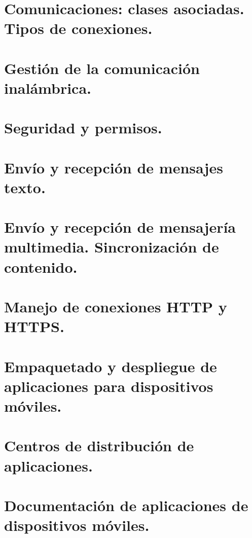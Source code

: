 \documentclass[a4paper,12pt,spanish]{sphinxmanual}
\begin{document}
\section{Comunicaciones: clases asociadas. Tipos de conexiones.}
\label{tema2:comunicaciones-clases-asociadas-tipos-de-conexiones}

\section{Gestión de la comunicación inalámbrica.}
\label{tema2:gestion-de-la-comunicacion-inalambrica}

\section{Seguridad y permisos.}
\label{tema2:seguridad-y-permisos}

\section{Envío y recepción de mensajes texto.}
\label{tema2:envio-y-recepcion-de-mensajes-texto}

\section{Envío y recepción de mensajería multimedia. Sincronización de contenido.}
\label{tema2:envio-y-recepcion-de-mensajeria-multimedia-sincronizacion-de-contenido}

\section{Manejo de conexiones HTTP y HTTPS.}
\label{tema2:manejo-de-conexiones-http-y-https}

\section{Empaquetado y despliegue de aplicaciones para dispositivos móviles.}
\label{tema2:empaquetado-y-despliegue-de-aplicaciones-para-dispositivos-moviles}

\section{Centros de distribución de aplicaciones.}
\label{tema2:centros-de-distribucion-de-aplicaciones}

\section{Documentación de aplicaciones de dispositivos móviles.}
\label{tema2:documentacion-de-aplicaciones-de-dispositivos-moviles}
\end{document}
